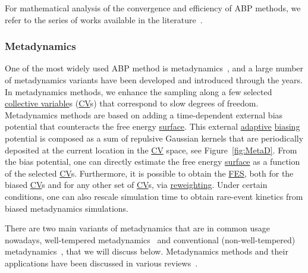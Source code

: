 \documentclass[9pt,review]{livecoms}
\begin{document}
For mathematical analysis of the convergence and efficiency of ABP methods, we refer to the series of works available in the literature~\cite{fort-jourdain-lelievre-stoltz-18,fort-jourdain-kuhn-lelievre-stoltz-15,fort-jourdain-kuhn-lelievre-stoltz-14,fort-jourdain-lelievre-stoltz-17}.


\subsubsection{Metadynamics}
One of the most widely used ABP method is metadynamics~\cite{Laio-PNAS-2002,Barducci-PRL-2008,Valsson2016_ARPC_MetaD}, and a large number of metadynamics variants have been developed and introduced through the years. In metadynamics methods, we enhance the sampling along a few selected \hyperlink{ref:CV} {collective variable}s (\hyperlink{ref:CV} {CV}s) that correspond to slow degrees of freedom. Metadynamics methods are based on adding a time-dependent external bias potential that counteracts the free energy \hyperlink{ref:FES} {surface}. This external \hyperlink{ref:Adaptive} {adaptive} \hyperlink{ref:biasingE} {biasing} potential is composed as a sum of repulsive Gaussian kernels that are periodically deposited at the current location in the \hyperlink{ref:CV} {CV} space, see Figure~\ref{fig:MetaD}. From the bias potential, one can directly estimate the free energy \hyperlink{ref:FES} {surface} as a function of the selected \hyperlink{ref:CV} {CV}s. Furthermore, it is possible to obtain the \hyperlink{ref:FES} {FES}, both for the biased \hyperlink{ref:CV} {CV}s and for any other set of \hyperlink{ref:CV} {CV}s, via \hyperlink{ref:Reweighting} {reweighting}. Under certain conditions, one can also rescale simulation time to obtain rare-event kinetics from biased metadynamics simulations.

There are two main variants of metadynamics that are in common usage nowadays, well-tempered metadynamics~\cite{Barducci-PRL-2008} and conventional (non-well-tempered) metadynamics~\cite{Laio-PNAS-2002}, that we will discuss below. Metadynamics methods and their applications have been discussed in various reviews~\cite{Barducci-WIREsCMS-2011,10.1080/08927022.2014.923574,10.1107/s2052252514027626,Valsson2016_ARPC_MetaD,10.1007/978-1-4939-9608-7_8,Bussi2020,BussiLaio_ReviewMetaD_2020}.
\end{document}
